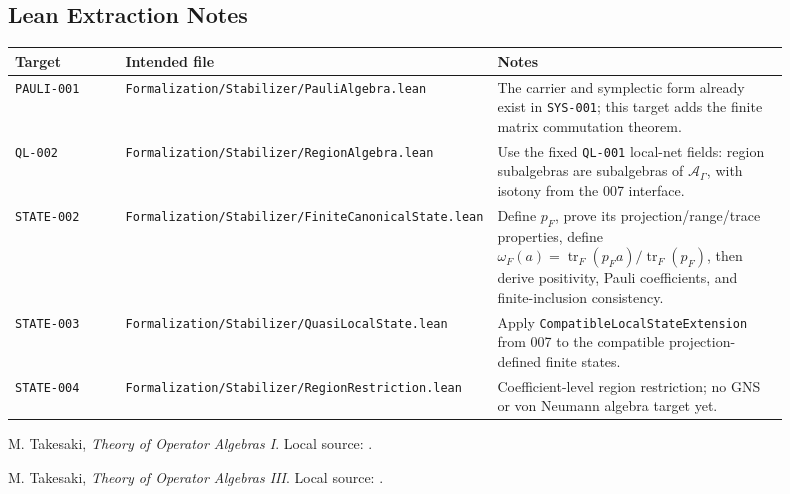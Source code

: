 \documentclass{article}
\newcommand{\cA}{\mathcal A}
\newcommand{\tr}{\operatorname{tr}}
\begin{document}
\subsection*{Lean Extraction Notes}

\begin{longtable}{@{}p{0.16\linewidth}p{0.34\linewidth}p{0.40\linewidth}@{}}
\toprule
Target & Intended file & Notes \\
\midrule
\endhead
\texttt{PAULI-001} &
\texttt{Formalization/Stabilizer/PauliAlgebra.lean} &
The carrier and symplectic form already exist in \texttt{SYS-001}; this target
adds the finite matrix commutation theorem. \\
\texttt{QL-002} &
\texttt{Formalization/Stabilizer/RegionAlgebra.lean} &
Use the fixed \texttt{QL-001} local-net fields: region subalgebras are
subalgebras of \(\cA_\Gamma\), with isotony from the 007 interface. \\
\texttt{STATE-002} &
\texttt{Formalization/Stabilizer/FiniteCanonicalState.lean} &
Define \(p_F\), prove its projection/range/trace properties, define
\(\omega_F(a)=\tr_F(p_Fa)/\tr_F(p_F)\), then derive positivity, Pauli
coefficients, and finite-inclusion consistency. \\
\texttt{STATE-003} &
\texttt{Formalization/Stabilizer/QuasiLocalState.lean} &
Apply \texttt{CompatibleLocalStateExtension} from 007 to the compatible
projection-defined finite states. \\
\texttt{STATE-004} &
\texttt{Formalization/Stabilizer/RegionRestriction.lean} &
Coefficient-level region restriction; no GNS or von Neumann algebra target yet. \\
\bottomrule
\end{longtable}

\begin{thebibliography}{9}
M. Takesaki, \emph{Theory of Operator Algebras I}.  Local source:
.

M. Takesaki, \emph{Theory of Operator Algebras III}.  Local source:
.
\end{thebibliography}
\end{document}
